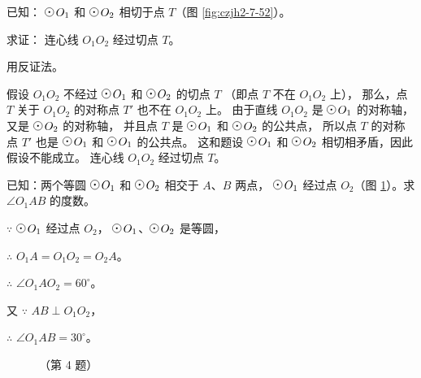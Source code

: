 已知： $\yuan\,O_1$ 和 $\yuan\,O_2$ 相切于点 $T$（图 \ref{fig:czjh2-7-52}）。

求证： 连心线 $O_1O_2$ 经过切点 $T$。

\zhengming 用反证法。

假设 $O_1O_2$ 不经过 $\yuan\,O_1$ 和 $\yuan\,O_2$ 的切点 $T$ （即点 $T$ 不在 $O_1O_2$ 上），
那么，点 $T$ 关于 $O_1O_2$ 的对称点 $T'$ 也不在 $O_1O_2$ 上。
由于直线 $O_1O_2$ 是 $\yuan\,O_1$ 的对称轴，又是 $\yuan\,O_2$ 的对称轴，
并且点 $T$ 是 $\yuan\,O_1$ 和 $\yuan\,O_2$ 的公共点，
所以点 $T$ 的对称点 $T'$ 也是 $\yuan\,O_1$ 和 $\yuan\,O_1$ 的公共点。
这和题设 $\yuan\,O_1$ 和 $\yuan\,O_2$ 相切相矛盾，因此假设不能成立。
连心线 $O_1O_2$ 经过切点 $T$。


\liti[0] 已知：两个等圆 $\yuan\,O_1$ 和 $\yuan\,O_2$ 相交于 $A$、$B$ 两点，
$\yuan\,O_1$ 经过点 $O_2$（图 \ref{fig:czjh2-7-53}）。求 $\angle O_1AB$ 的度数。

\jie $\because$ \quad $\yuan\,O_1$ 经过点 $O_2$， $\yuan\,O_1$、$\yuan\,O_2$ 是等圆，

$\therefore$ \quad $O_1A = O_1O_2 = O_2A$。

$\therefore$ \quad $\angle O_1AO_2 = 60^\circ$。

又 $\because$ \quad $AB \perp O_1O_2$，

$\therefore$ \quad $\angle O_1AB = 30^\circ$。


\begin{figure}[htbp]
    \centering
    \begin{minipage}[b]{5.2cm}
        \centering
        
        \caption{}\label{fig:czjh2-7-53}
    \end{minipage}
    \qquad
    \begin{minipage}[b]{10.5cm}
        \centering
        \begin{minipage}[b]{5.6cm}
            \centering
            
        \end{minipage}
        \begin{minipage}[b]{4cm}
            \centering
            
        \end{minipage}
        \caption*{（第 4 题）}
    \end{minipage}
\end{figure}



